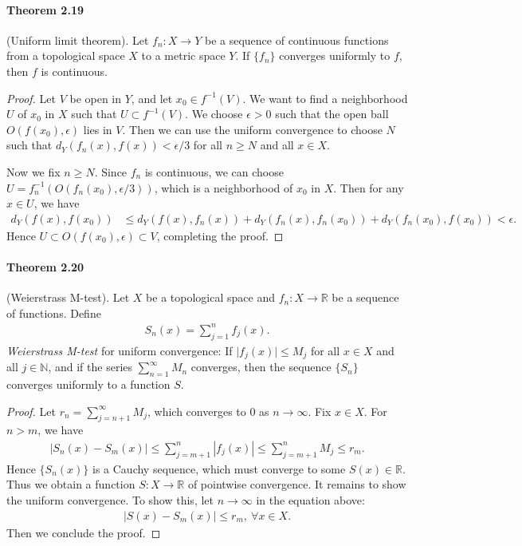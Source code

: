 \documentclass{article}
\numberwithin{equation}{section}
\theoremstyle{plain}
\theoremstyle{definition}
\begin{document}
\paragraph{Theorem 2.19\label{thm:2.19}} (Uniform limit theorem). Let $f_n:X\to Y$ be a sequence of continuous functions from a topological space $X$ to a metric space $Y$. If $\{f_n\}$ converges uniformly to $f$, then $f$ is continuous.
\begin{proof}
Let $V$ be open in $Y$, and let $x_0\in f^{-1}(V)$. We want to find a neighborhood $U$ of $x_0$ in $X$ such that $U\subset f^{-1}(V)$. We choose $\epsilon > 0$ such that the open ball $O(f(x_0),\epsilon)$ lies in $V$. Then we can use the uniform convergence to choose $N$ such that $d_Y(f_n(x),f(x)) < \epsilon/3$ for all $n\geq N$ and all $x\in X$.

Now we fix $n\geq N$. Since $f_n$ is continuous, we can choose $U=f_n^{-1}(O(f_n(x_0),\epsilon/3))$, which is a neighborhood of $x_0$ in $X$. Then for any $x\in U$, we have
\begin{align*}
	d_Y(f(x),f(x_0)) &\leq d_Y(f(x),f_n(x)) + d_Y(f_n(x),f_n(x_0)) + d_Y(f_n(x_0),f(x_0)) < \epsilon.
\end{align*}
Hence $U\subset O(f(x_0),\epsilon)\subset V$, completing the proof.
\end{proof}

\paragraph{Theorem 2.20\label{thm:2.20}} (Weierstrass M-test). Let $X$ be a topological space and $f_n:X\to\mathbb{R}$ be a sequence of functions. Define
\begin{align*}
	S_n(x) = \sum_{j=1}^n f_j(x).
\end{align*}
\textit{Weierstrass M-test} for uniform convergence: If $\vert f_j(x)\vert \leq M_j$ for all $x\in X$ and all $j\in\mathbb{N}$, and if the series $\sum_{n=1}^\infty M_n$ converges, then the sequence $\{S_n\}$ converges uniformly to a function $S$.
\begin{proof}
Let $r_n=\sum_{j=n+1}^\infty M_j$, which converges to $0$ as $n\to\infty$. Fix $x\in X$. For $n>m$, we have
\begin{align*}
	\left\vert S_n(x) - S_m(x)\right\vert \leq \sum_{j=m+1}^n \left\vert f_j(x)\right\vert \leq \sum_{j=m+1}^n M_j \leq r_m.
\end{align*}
Hence $\{S_n(x)\}$ is a Cauchy sequence, which must converge to some $S(x)\in\mathbb{R}$. Thus we obtain a function $S:X\to\mathbb{R}$ of pointwise convergence. It remains to show the uniform convergence. To show this, let $n\to\infty$ in the equation above:
\begin{align*}
	\left\vert S(x)-S_m(x)\right\vert \leq r_m,\ \forall x\in X.
\end{align*}
Then we conclude the proof.
\end{proof}
\end{document}
